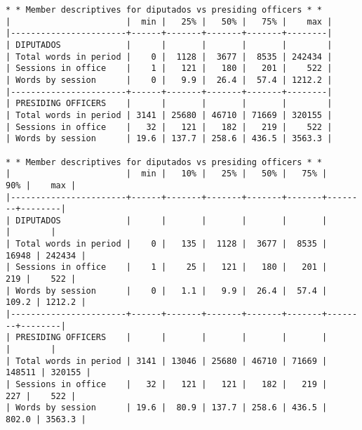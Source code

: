 \documentclass[letter,12pt]{article}
\begin{document}
\singlespacing
\begin{footnotesize}
\begin{verbatim}
* * Member descriptives for diputados vs presiding officers * *
|                       |  min |   25% |   50% |   75% |    max |
|-----------------------+------+-------+-------+-------+--------|
| DIPUTADOS             |      |       |       |       |        |
| Total words in period |    0 |  1128 |  3677 |  8535 | 242434 |
| Sessions in office    |    1 |   121 |   180 |   201 |    522 |
| Words by session      |    0 |   9.9 |  26.4 |  57.4 | 1212.2 |
|-----------------------+------+-------+-------+-------+--------|
| PRESIDING OFFICERS    |      |       |       |       |        |
| Total words in period | 3141 | 25680 | 46710 | 71669 | 320155 |
| Sessions in office    |   32 |   121 |   182 |   219 |    522 |
| Words by session      | 19.6 | 137.7 | 258.6 | 436.5 | 3563.3 |

* * Member descriptives for diputados vs presiding officers * *
|                       |  min |   10% |   25% |   50% |   75% |    90% |    max |
|-----------------------+------+-------+-------+-------+-------+--------+--------|
| DIPUTADOS             |      |       |       |       |       |        |        |
| Total words in period |    0 |   135 |  1128 |  3677 |  8535 |  16948 | 242434 |
| Sessions in office    |    1 |    25 |   121 |   180 |   201 |    219 |    522 |
| Words by session      |    0 |   1.1 |   9.9 |  26.4 |  57.4 |  109.2 | 1212.2 |
|-----------------------+------+-------+-------+-------+-------+--------+--------|
| PRESIDING OFFICERS    |      |       |       |       |       |        |        |
| Total words in period | 3141 | 13046 | 25680 | 46710 | 71669 | 148511 | 320155 |
| Sessions in office    |   32 |   121 |   121 |   182 |   219 |    227 |    522 |
| Words by session      | 19.6 |  80.9 | 137.7 | 258.6 | 436.5 |  802.0 | 3563.3 |

\end{verbatim}
\end{footnotesize}
\doublespacing









\listofendnotes








\end{document}
